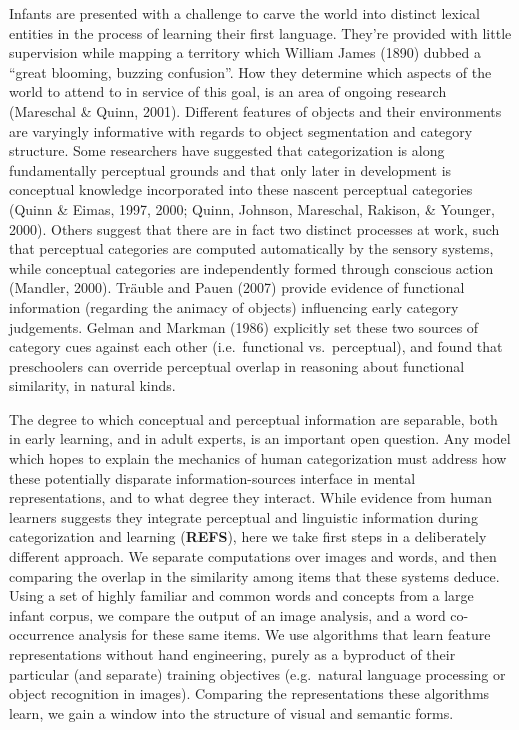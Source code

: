 \documentclass[10pt, letterpaper]{article}
\begin{document}
Infants are presented with a challenge to carve the world into distinct
lexical entities in the process of learning their first language.
They're provided with little supervision while mapping a territory which
William James (1890) dubbed a ``great blooming, buzzing confusion''. How
they determine which aspects of the world to attend to in service of
this goal, is an area of ongoing research (Mareschal \& Quinn, 2001).
Different features of objects and their environments are varyingly
informative with regards to object segmentation and category structure.
Some researchers have suggested that categorization is along
fundamentally perceptual grounds and that only later in development is
conceptual knowledge incorporated into these nascent perceptual
categories (Quinn \& Eimas, 1997, 2000; Quinn, Johnson, Mareschal,
Rakison, \& Younger, 2000). Others suggest that there are in fact two
distinct processes at work, such that perceptual categories are computed
automatically by the sensory systems, while conceptual categories are
independently formed through conscious action (Mandler, 2000). Träuble
and Pauen (2007) provide evidence of functional information (regarding
the animacy of objects) influencing early category judgements. Gelman
and Markman (1986) explicitly set these two sources of category cues
against each other (i.e.~functional vs.~perceptual), and found that
preschoolers can override perceptual overlap in reasoning about
functional similarity, in natural kinds.

The degree to which conceptual and perceptual information are separable,
both in early learning, and in adult experts, is an important open
question. Any model which hopes to explain the mechanics of human
categorization must address how these potentially disparate
information-sources interface in mental representations, and to what
degree they interact. While evidence from human learners suggests they
integrate perceptual and linguistic information during categorization
and learning (\textbf{REFS}), here we take first steps in a deliberately
different approach. We separate computations over images and words, and
then comparing the overlap in the similarity among items that these
systems deduce. Using a set of highly familiar and common words and
concepts from a large infant corpus, we compare the output of an image
analysis, and a word co-occurrence analysis for these same items. We use
algorithms that learn feature representations without hand engineering,
purely as a byproduct of their particular (and separate) training
objectives (e.g.~natural language processing or object recognition in
images). Comparing the representations these algorithms learn, we gain a
window into the structure of visual and semantic forms.
\end{document}
